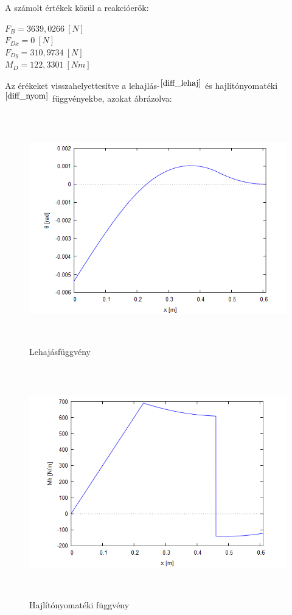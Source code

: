 \documentclass{article}
\begin{document}
		A számolt értékek közül a reakcióerők:
		\begin{center}
			$F_B = 3639,0266~[N]$\\
			$F_{Dx} = 0~[N]$\\
			$F_{Dy} = 310,9734~[N]$\\
			$M_D = 122,3301~[Nm]$
		\end{center}
		Az érékeket visszahelyettesítve a lehajlás-$^{\ref{diff_lehaj}}$ és hajlítónyomatéki$^{\ref{diff_nyom}}$ függvényekbe, azokat ábrázolva: 
		\begin{figure}[h!]
			\begin{center}
				\includegraphics[height=10cm]{images/diff_lehaj}
			\end{center}
			\caption{Lehajásfüggvény}
			\label{diff_lehaj}
		\end{figure}
	\newpage
		\begin{figure}[h!]
			\begin{center}
				\includegraphics[height=10cm]{images/diff_nyomatek}
			\end{center}
			\caption{Hajlítónyomatéki függvény}
			\label{diff_nyom}
		\end{figure}
	
\end{document}

